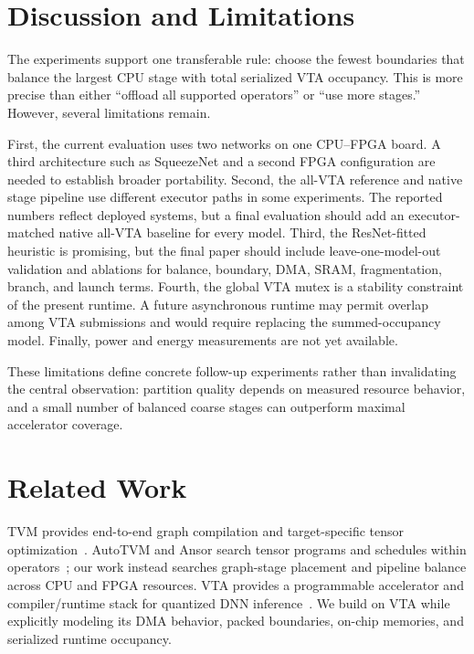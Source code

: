 \documentclass[conference]{IEEEtran}
\begin{document}
\section{Discussion and Limitations}

The experiments support one transferable rule: choose the fewest boundaries that balance the largest CPU stage with total serialized VTA occupancy. This is more precise than either ``offload all supported operators'' or ``use more stages.'' However, several limitations remain.

First, the current evaluation uses two networks on one CPU--FPGA board. A third architecture such as SqueezeNet and a second FPGA configuration are needed to establish broader portability. Second, the all-VTA reference and native stage pipeline use different executor paths in some experiments. The reported numbers reflect deployed systems, but a final evaluation should add an executor-matched native all-VTA baseline for every model. Third, the ResNet-fitted heuristic is promising, but the final paper should include leave-one-model-out validation and ablations for balance, boundary, DMA, SRAM, fragmentation, branch, and launch terms. Fourth, the global VTA mutex is a stability constraint of the present runtime. A future asynchronous runtime may permit overlap among VTA submissions and would require replacing the summed-occupancy model. Finally, power and energy measurements are not yet available.

These limitations define concrete follow-up experiments rather than invalidating the central observation: partition quality depends on measured resource behavior, and a small number of balanced coarse stages can outperform maximal accelerator coverage.

\section{Related Work}

TVM provides end-to-end graph compilation and target-specific tensor optimization~\cite{chen2018tvm}. AutoTVM and Ansor search tensor programs and schedules within operators~\cite{chen2018autotvm,zheng2020ansor}; our work instead searches graph-stage placement and pipeline balance across CPU and FPGA resources. VTA provides a programmable accelerator and compiler/runtime stack for quantized DNN inference~\cite{moreau2019vta}. We build on VTA while explicitly modeling its DMA behavior, packed boundaries, on-chip memories, and serialized runtime occupancy.
\end{document}
